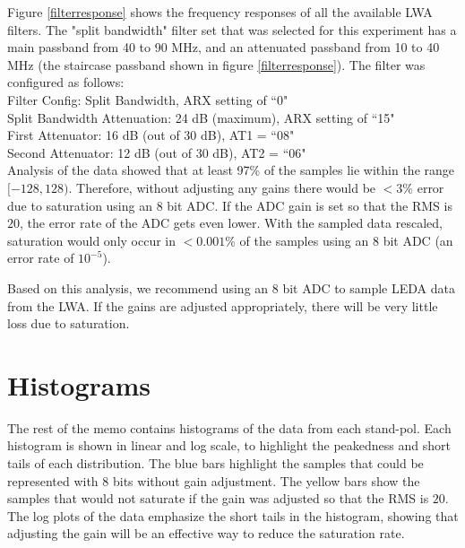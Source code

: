 \documentclass[fleqn, onecolumn]{article}
\begin{document}
Figure \ref{filterresponse} shows the  frequency responses of all the available LWA filters.
The "split bandwidth" filter set that was selected for this experiment has a
main passband from 40 to 90 MHz, and an attenuated passband
from 10 to 40 MHz (the staircase passband shown in figure \ref{filterresponse}).  
The filter was configured as follows: \\
Filter Config:  Split Bandwidth, ARX setting of ``0" \\
Split Bandwidth Attenuation:  24 dB (maximum), ARX setting of ``15"  \\
First Attenuator:  16 dB (out of 30 dB), AT1 = ``08" \\
Second Attenuator:  12 dB (out of 30 dB), AT2 = ``06" \\



Analysis of the data showed that at least 97\% of the samples lie within the range $[-128,128)$. 
Therefore, without adjusting any gains there would be $< 3\%$ error due to saturation using an 8 bit ADC.
If the ADC gain is set so that the RMS is $20$, the error rate of the ADC gets even lower. 
With the sampled data rescaled, saturation would only occur in $<0.001\%$ of the samples using an 8 bit ADC (an error rate of $10^{-5}$). 

Based on this analysis, we recommend using an 8 bit ADC to sample LEDA data from the LWA. If the gains are adjusted appropriately, there will be very little loss due to saturation.

\begin{table}[h]

\end{table}

\section{Histograms}
The rest of the memo contains histograms of the data from each stand-pol. 
Each histogram is shown in linear and log scale, to highlight the peakedness and short tails of each distribution. 
The blue bars highlight the samples that could be represented with 8 bits without gain adjustment. 
The yellow bars show the samples that would not saturate if the gain was adjusted so that the RMS is $20$.
The log plots of the data emphasize the short tails in the histogram, showing that adjusting the gain will be an effective way to reduce the saturation rate. 



\end{document}
